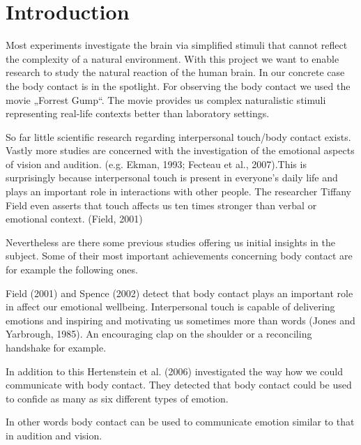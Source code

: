 \documentclass[10pt,a4paper,twocolumn]{article}
\begin{document}

\section*{Introduction}


Most experiments investigate the brain via simplified stimuli that cannot
reflect the complexity of a natural environment. With this project we want to
enable research to study the natural reaction of the human brain. In our
concrete case the body contact is in the spotlight. For observing the body
contact we used the movie „Forrest Gump“. The movie provides us complex
naturalistic stimuli representing real-life contexts better than laboratory
settings.

So far little scientific research regarding interpersonal touch/body contact
exists. Vastly more studies are concerned with the investigation of the
emotional aspects of vision and audition. (e.g. Ekman, 1993; Fecteau et al.,
2007).This is surprisingly because interpersonal touch is present in everyone's
daily life and plays an important role in interactions with other people. The
researcher Tiffany Field even asserts that touch affects us ten times stronger
than verbal or emotional context. (Field, 2001)  

Nevertheless are there some previous studies offering  us initial insights in
the subject.  Some of their  most important achievements concerning body
contact are for example the following ones.

Field (2001) and Spence (2002) detect that body contact plays an important role
in affect our emotional wellbeing. Interpersonal touch is capable of delivering
emotions and inspiring and motivating us sometimes more than words (Jones and
Yarbrough, 1985). An encouraging clap on the shoulder or a reconciling
handshake for example. 

In addition to this Hertenstein et al. (2006) investigated the way how we could
communicate with body contact. They detected that body contact could be used to
confide as many as six different types of emotion.

In other words body contact can be used to communicate emotion similar to that
in audition and vision.
\end{document}
